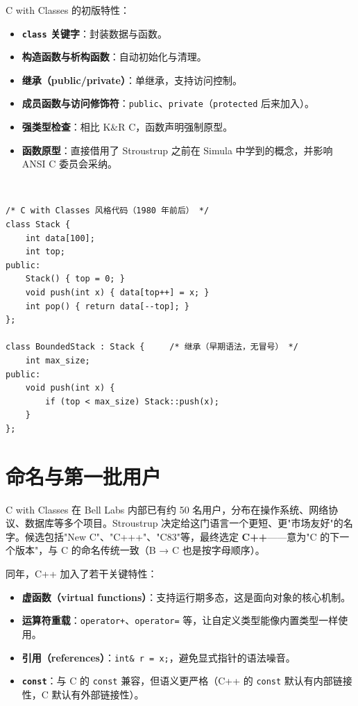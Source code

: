 \documentclass[12pt,a4paper,fontset=fandol]{ctexbook}
\newcommand{\cpplabel}{%
  \tcbox[on line,colback=cppheadbg,colframe=cppheadbg,
    boxrule=0pt,arc=1pt,left=2pt,right=2pt,top=1pt,bottom=1pt,
    colupper=white,fontupper=\scriptsize\bfseries]{C++}}
\newcommand{\yearlabel}[1]{%
  \tcbox[on line,colback=yearheadbg,colframe=yearheadbg,
    boxrule=0pt,arc=1pt,left=3pt,right=3pt,top=1pt,bottom=1pt,
    colupper=white,fontupper=\scriptsize\bfseries]{#1}}
\newcommand{\kw}[1]{\texttt{#1}}
\newcommand{\yrlbl}[1]{\yearlabel{#1}}
\begin{document}
C with Classes 的初版特性：

\begin{itemize}
  \item \textbf{\kw{class} 关键字}：封装数据与函数。
  \item \textbf{构造函数与析构函数}：自动初始化与清理。
  \item \textbf{继承（public/private）}：单继承，支持访问控制。
  \item \textbf{成员函数与访问修饰符}：\kw{public}、\kw{private}（\kw{protected} 后来加入）。
  \item \textbf{强类型检查}：相比 K\&R C，函数声明强制原型。
  \item \textbf{函数原型}：直接借用了 Stroustrup 之前在 Simula 中学到的概念，并影响 ANSI C 委员会采纳。
\end{itemize}

\cpplabel\ \begin{lstlisting}
/* C with Classes 风格代码（1980 年前后） */
class Stack {
    int data[100];
    int top;
public:
    Stack() { top = 0; }
    void push(int x) { data[top++] = x; }
    int pop() { return data[--top]; }
};

class BoundedStack : Stack {     /* 继承（早期语法，无冒号） */
    int max_size;
public:
    void push(int x) {
        if (top < max_size) Stack::push(x);
    }
};
\end{lstlisting}

\section{命名与第一批用户}

\yrlbl{1983} C with Classes 在 Bell Labs 内部已有约 50 名用户，分布在操作系统、网络协议、数据库等多个项目。Stroustrup 决定给这门语言一个更短、更"市场友好"的名字。候选包括"New C"、"C+++"、"C83"等，最终选定 \textbf{C++}——意为"C 的下一个版本"，与 C 的命名传统一致（B → C 也是按字母顺序）。

\yrlbl{1983} 同年，C++ 加入了若干关键特性：

\begin{itemize}
  \item \textbf{虚函数（virtual functions）}：支持运行期多态，这是面向对象的核心机制。
  \item \textbf{运算符重载}：\kw{operator+}、\kw{operator=} 等，让自定义类型能像内置类型一样使用。
  \item \textbf{引用（references）}：\kw{int\& r = x;}，避免显式指针的语法噪音。
  \item \textbf{\kw{const}}：与 C 的 \kw{const} 兼容，但语义更严格（C++ 的 \kw{const} 默认有内部链接性，C 默认有外部链接性）。
\end{itemize}
\end{document}
